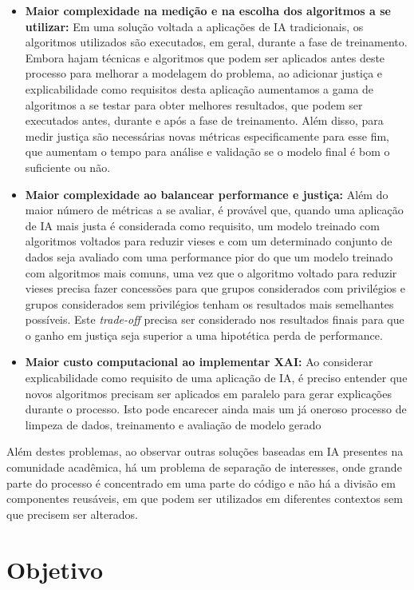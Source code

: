 \documentclass[portugues]{ic-tese}
\begin{document}
\begin{itemize}
\item \textbf{Maior complexidade na medição e na escolha dos algoritmos a se utilizar:} Em uma solução voltada a aplicações de IA tradicionais, os algoritmos utilizados são executados, em geral, durante a fase de treinamento. Embora hajam técnicas e algoritmos que podem ser aplicados antes deste processo para melhorar a modelagem do problema, ao adicionar justiça e explicabilidade como requisitos desta aplicação aumentamos a gama de algoritmos a se testar para obter melhores resultados, que podem ser executados antes, durante e após a fase de treinamento. Além disso, para medir justiça são necessárias novas métricas especificamente para esse fim, que aumentam o tempo para análise e validação se o modelo final é bom o suficiente ou não.
\item \textbf{Maior complexidade ao balancear performance e justiça:} Além do maior número de métricas a se avaliar, é provável que, quando uma aplicação de IA mais justa é considerada como requisito, um modelo treinado com algoritmos voltados para reduzir vieses e com um determinado conjunto de dados seja avaliado com uma performance pior do que um modelo treinado com algoritmos mais comuns, uma vez que o algoritmo voltado para reduzir vieses precisa fazer concessões para que grupos considerados com privilégios e grupos considerados sem privilégios tenham os resultados mais semelhantes possíveis. Este \textit{trade-off} precisa ser considerado nos resultados finais para que o ganho em justiça seja superior a uma hipotética perda de performance.
\item \textbf{Maior custo computacional ao implementar XAI:} Ao considerar explicabilidade como requisito de uma aplicação de IA, é preciso entender que novos algoritmos precisam ser aplicados em paralelo para gerar explicações durante o processo. Isto pode encarecer ainda mais um já oneroso processo de limpeza de dados, treinamento e avaliação de modelo gerado
\end{itemize}

Além destes problemas, ao observar outras soluções baseadas em IA presentes na comunidade acadêmica, há um problema de separação de interesses, onde grande parte do processo é concentrado em uma parte do código e não há a divisão em componentes reusáveis, em que podem ser utilizados em diferentes contextos sem que precisem ser alterados.

\section{Objetivo}
\end{document}
